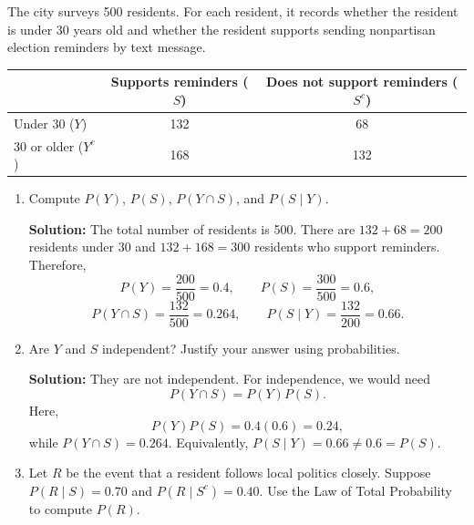 \documentclass[11pt]{exam}
\begin{document}
\begin{questions}

\question[2.5]
The city surveys 500 residents. For each resident, it records whether the resident is under 30 years old and whether the resident supports sending nonpartisan election reminders by text message.

\begin{center}
\begin{tabular}{lcc}
\toprule
 & Supports reminders ($S$) & Does not support reminders ($S^c$) \\
\midrule
Under 30 ($Y$)        & 132 & 68 \\
30 or older ($Y^c$)   & 168 & 132 \\
\bottomrule
\end{tabular}
\end{center}

\begin{enumerate}[leftmargin = 0.5cm, label = (\alph*), rightmargin = 0.2cm]
    \item Compute $P(Y)$, $P(S)$, $P(Y\cap S)$, and $P(S\mid Y)$.

    \begin{solutionorbox}[5.8cm]
    \textbf{Solution:} The total number of residents is 500. There are $132+68=200$ residents under 30 and $132+168=300$ residents who support reminders. Therefore,
    \[
    P(Y)=\frac{200}{500}=0.4, \qquad
    P(S)=\frac{300}{500}=0.6,
    \]
    \[
    P(Y\cap S)=\frac{132}{500}=0.264, \qquad
    P(S\mid Y)=\frac{132}{200}=0.66.
    \]
    \end{solutionorbox}

    \item Are $Y$ and $S$ independent? Justify your answer using probabilities.

    \begin{solutionorbox}[4.8cm]
    \textbf{Solution:} They are not independent. For independence, we would need
    \[
    P(Y\cap S)=P(Y)P(S).
    \]
    Here,
    \[
    P(Y)P(S)=0.4(0.6)=0.24,
    \]
    while $P(Y\cap S)=0.264$. Equivalently, $P(S\mid Y)=0.66\ne 0.6=P(S)$.
    \end{solutionorbox}

    \item Let $R$ be the event that a resident follows local politics closely. Suppose $P(R\mid S)=0.70$ and $P(R\mid S^c)=0.40$. Use the Law of Total Probability to compute $P(R)$.


\end{enumerate}
\end{questions}
\end{document}
